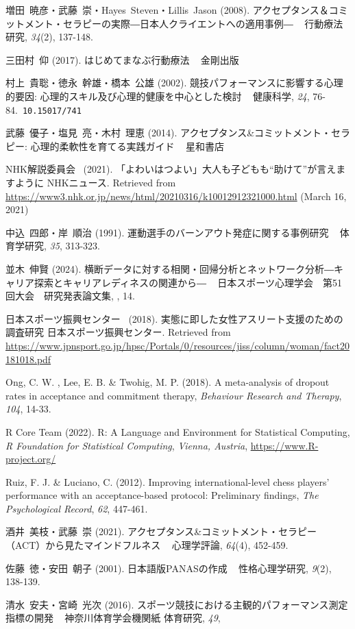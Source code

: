 \documentclass[12pt,a4paper,xelatex,ja=standard]{bxjsarticle}
\begin{document}
増田~暁彦・武藤~崇・Hayes~Steven・Lillis~Jason (2008).
アクセプタンス＆コミットメント・セラピーの実際―日本人クライエントへの適用事例―
~ 行動療法研究, \emph{34}(2), 137-148.

三田村~仰 (2017). はじめてまなぶ行動療法 ~ 金剛出版

村上~貴聡・徳永~幹雄・橋本~公雄 (2002).
競技パフォーマンスに影響する心理的要因:
心理的スキル及び心理的健康を中心とした検討 ~ 健康科学, \emph{24},
76-84.~\verb|10.15017/741|

武藤~優子・塩見~亮・木村~理恵 (2014).
アクセプタンス\&コミットメント・セラピー: 心理的柔軟性を育てる実践ガイド
~ 星和書店

NHK解説委員会~ (2021).
「よわいはつよい」大人も子どもも``助けて''が言えますように NHKニュース.
Retrieved from
\url{https://www3.nhk.or.jp/news/html/20210316/k10012912321000.html}
(March 16, 2021)

中込~四郎・岸~順治 (1991). 運動選手のバーンアウト発症に関する事例研究 ~
体育学研究, \emph{35}, 313-323.

並木~伸賢 (2024).
横断データに対する相関・回帰分析とネットワーク分析―キャリア探索とキャリアレディネスの関連から―
~ 日本スポーツ心理学会　第51回大会　研究発表論文集, , 14.

日本スポーツ振興センター~ (2018).
実態に即した女性アスリート支援のための調査研究 日本スポーツ振興センター.
Retrieved from
\url{https://www.jpnsport.go.jp/hpsc/Portals/0/resources/jiss/column/woman/fact20181018.pdf}

Ong, C. W. , Lee, E. B. \& Twohig, M. P. (2018). A meta-analysis of
dropout rates in acceptance and commitment therapy,
\emph{Behaviour Research and Therapy}, \emph{104}, 14-33.

R Core Team (2022). R: A Language and Environment for Statistical
Computing, \emph{R Foundation for Statistical Computing},
\emph{Vienna, Austria}, \url{https://www.R-project.org/}

Ruiz, F. J. \& Luciano, C. (2012). Improving international-level chess
players' performance with an acceptance-based protocol: Preliminary
findings, \emph{The Psychological Record}, \emph{62}, 447-461.

酒井~美枝・武藤~崇 (2021).
アクセプタンス\&コミットメント・セラピー（ACT）から見たマインドフルネス
~ 心理学評論, \emph{64}(4), 452-459.

佐藤~徳・安田~朝子 (2001). 日本語版PANASの作成 ~ 性格心理学研究,
\emph{9}(2), 138-139.

清水~安夫・宮崎~光次 (2016).
スポーツ競技における主観的パフォーマンス測定指標の開発 ~
神奈川体育学会機関紙 体育研究, \emph{49},
\end{document}
